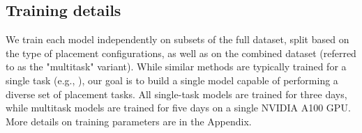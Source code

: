 \subsection{Training details}

We train each model independently on subsets of the full dataset, split based on the type of placement configurations, as well as on the combined dataset (referred to as the "multitask" variant). While similar methods are typically trained for a single task (e.g., \cite{simeonov2023rpdiff}), our goal is to build a single model capable of performing a diverse set of placement tasks. All single-task models are trained for three days, while multitask models are trained for five days on a single NVIDIA A100 GPU. More details on training parameters are in the Appendix. 

